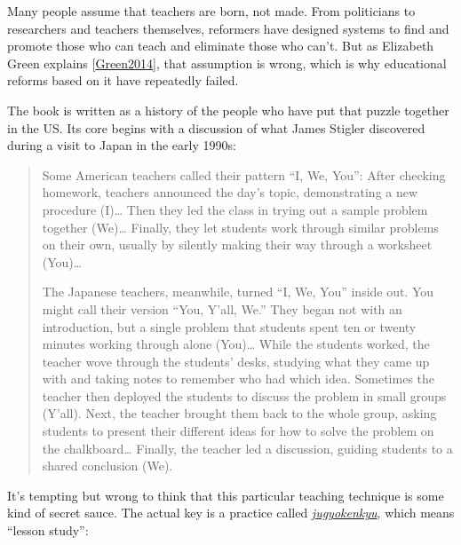 \documentclass[10pt,statementpaper]{memoir}
\begin{document}
Many people assume that teachers are born, not made. From politicians to
researchers and teachers themselves, reformers have designed systems to
find and promote those who can teach and eliminate those who can't. But
as Elizabeth Green explains
{[}\href{biblio.html\#green-babt}{Green2014}{]}, that assumption is
wrong, which is why educational reforms based on it have repeatedly
failed.

The book is written as a history of the people who have put that puzzle
together in the US. Its core begins with a discussion of what James
Stigler discovered during a visit to Japan in the early 1990s:

\begin{quote}
Some American teachers called their pattern ``I, We, You'': After
checking homework, teachers announced the day's topic, demonstrating a
new procedure (I)\ldots{} Then they led the class in trying out a sample
problem together (We)\ldots{} Finally, they let students work through
similar problems on their own, usually by silently making their way
through a worksheet (You)\ldots{}

The Japanese teachers, meanwhile, turned ``I, We, You'' inside out. You
might call their version ``You, Y'all, We.'' They began not with an
introduction, but a single problem that students spent ten or twenty
minutes working through alone (You)\ldots{} While the students worked,
the teacher wove through the students' desks, studying what they came up
with and taking notes to remember who had which idea. Sometimes the
teacher then deployed the students to discuss the problem in small
groups (Y'all). Next, the teacher brought them back to the whole group,
asking students to present their different ideas for how to solve the
problem on the chalkboard\ldots{} Finally, the teacher led a discussion,
guiding students to a shared conclusion (We).
\end{quote}

It's tempting but wrong to think that this particular teaching technique
is some kind of secret sauce. The actual key is a practice called
\emph{\href{gloss.html\#jugyokenkyu}{jugyokenkyu}}, which means ``lesson
study'':
\end{document}
